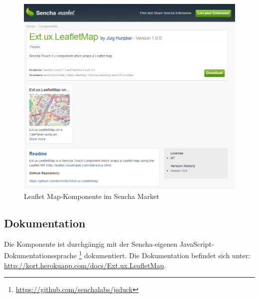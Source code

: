 \begin{figure}[H]
	\centering
	\includegraphics[scale=0.6]{images/implementation/frontend/leafletmap-sencha-market}
	\caption{Leaflet Map-Komponente im Sencha Market}
	\label{image-leafletmap-sencha-market}
\end{figure}

\subsection{Dokumentation}
Die Komponente ist durchgängig mit der Sencha-eigenen JavaScript-Dokumentationssprache \footnote{\url{https://github.com/senchalabs/jsduck}} dokumentiert. Die Dokumentation befindet sich unter: \url{http://kort.herokuapp.com/docs/Ext.ux.LeafletMap}.